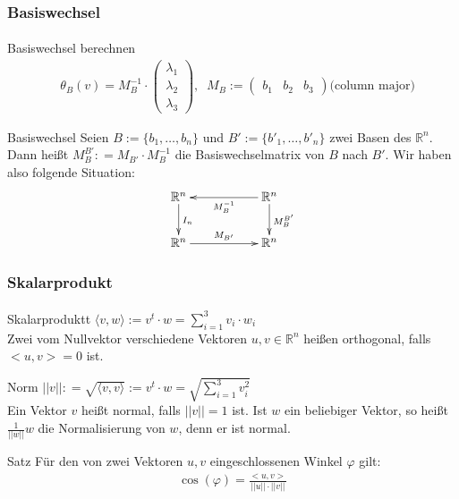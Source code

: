 \documentclass{beamer}
\begin{document}
\begin{frame}
    \frametitle{Basiswechsel}
\framesubtitle{}
\begin{block}{Basiswechsel berechnen}
\begin{eqnarray*}
& \theta_B(v) =  M_B^{-1} \cdot \begin{pmatrix}
 \lambda_1 \\ \lambda_2 \\ \lambda_3
\end{pmatrix}, \; \; M_B :=  \begin{pmatrix}
 b_1 & b_2 &  b_3
\end{pmatrix} \text{(column major)}
\end{eqnarray*}
\end{block}

\begin{block}{Basiswechsel}
Seien $B:= \{ b_1, \hdots , b_n \}$ und $B':= \{ b'_1, \hdots , b'_n \}$ zwei Basen des $\mathbb{R}^n$.
Dann heißt $M_{B}^{B'} : = M_{B'}  \cdot M_{B}^{-1} $ die Basiswechselmatrix von $B$ nach $B'$. Wir haben also folgende Situation:
\begin{align*}
\xymatrix{
\mathbb{R}^n  \ar[d]^{I_n} &  & \ar[ll]^{M_B^{-1}} \mathbb{R}^n \ar[d]^{M_{B}^{B'}} \\
\mathbb{R}^n  \ar[rr]^{M_{B'}} & &  \mathbb{R}^n
}
\end{align*}
\end{block}
\end{frame}


\begin{frame}
    \frametitle{Skalarprodukt}
\framesubtitle{}
\begin{block}{Skalarproduktt}
$\langle v ,w \rangle := v^t \cdot w = \sum_{i=1}^{3} v_i \cdot w_i$ \\
Zwei vom Nullvektor verschiedene Vektoren $u,v \in \mathbb{R}^n$ heißen orthogonal, falls $<u,v> = 0$ ist. 
\end{block}
\begin{block}{Norm}
$||v || : = \sqrt{\langle v ,v \rangle} := v^t \cdot w = \sqrt{\sum_{i=1}^{3} v_i ^{2}}$ \\
Ein Vektor $v$ heißt normal, falls $||v|| = 1$ ist.
Ist $w$ ein beliebiger Vektor, so heißt $\frac{1}{||w||} w$ die Normalisierung von $w$, denn er ist normal.
\end{block}
\begin{block}{Satz}
Für den von zwei Vektoren $u,v$ eingeschlossenen Winkel $\varphi$ gilt:
\begin{align*}
\cos(\varphi) = \frac{<u,v>}{||u|| \cdot ||v||}
\end{align*}
\end{block}
\end{frame}
\end{document}
